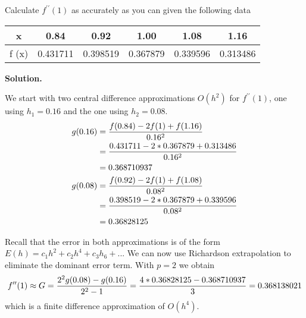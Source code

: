 \begin{exercise}{3} %
Calculate $f^{\prime \prime}(1)$ as accurately as you can given the following data
\begin{table}[h]
\centering
\begin{tabular}{|c|c|c|c|c|c|}
\hline
x &0.84& 0.92& 1.00& 1.08& 1.16\\ \hline
f (x) &0.431711 &0.398519& 0.367879& 0.339596 & 0.313486 \\ \hline
\end{tabular}
\end{table}

\textbf{Solution.} 

We start with two central difference approximations $O(h^2)$ for $f^{\prime \prime}(1)$, one using $h_1=0.16$ and the one using $h_2=0.08$.
\begin{align}
g(0.16)&=\frac{f(0.84) - 2f(1)+f(1.16)}{0.16^2} \notag \\
			&=\frac{0.431711 - 2*0.367879+0.313486}{0.16^2} \notag \\
            &=0.368710937 \notag \\
g(0.08)&=\frac{f(0.92) - 2f(1)+f(1.08)}{0.08^2} \notag \\
			&=\frac{0.398519 - 2*0.367879+0.339596}{0.08^2} \notag \\
            &=0.36828125 \notag
\end{align}

Recall that the error in both approximations is of the form \(E(h) = c_1h^2 + c_2h^4+c_3h_6 +...\) We can now use Richardson extrapolation to eliminate the dominant error term. With $p = 2$ we obtain 
\begin{align}
f^{\prime \prime}(1) \approx G = \frac{2^2g(0.08)-g(0.16)}{2^2-1} = \frac{4*0.36828125-0.368710937}{3}
= 0.368138021 \notag
\end{align}
which is a finite difference approximation of \(O(h^4)\).
\end{exercise}

